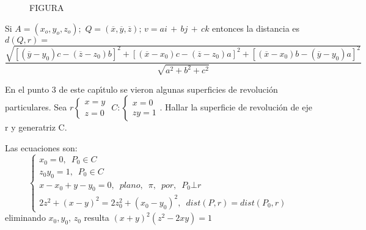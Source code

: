 \begin{figure}[htb]
\centering
FIGURA
\end{figure}
%
%
%
%


\bigskip

Si $A = ( x_{o} ,y_{o} ,z_{o});\,\,Q = (\overline {x} ,\overline
{y} ,\overline {z} );\,v = ai\, + \,bj\, + \,ck$ entonces la
distancia es $ d(Q,r)=$ $$
\frac{\sqrt{[(\overline{y}-y_{0})c-(\overline{z}-z_{0})b]^{2}+
[(\overline{x}-x_{0})c-(\overline{z}-z_{0})a]^{2}+[(\overline{x}-x_{0})b-(\overline{y}-y_{0})a]^{2}}}
{\sqrt{a^{2}+b^{2}+c^{2}}}$$

\bigskip

\begin{ejemplo}\label{piej5.1}En el punto 3 de este cap\'{\i}tulo se vieron
algunas superficies de revoluci\'{o}n particulares. Sea $r\left\{
\begin{array}{l}
 {x = y} \\
 {z = 0}
 \end{array} \right.$ $C:\left\{ \begin{array}{l}
 {x = 0} \\
 {zy = 1}
 \end{array} \right.$. Hallar la superficie de revoluci\'{o}n de eje r
y generatriz C.

Las ecuaciones son:
\[
\left\{ \begin{array}{l}
 {x_{0}^{}  = 0                                 ,\,\,\,            P_{0}^{}  \in C}
\\
 {z_{0}^{} y_{0}^{}  = 1                  ,\,\,\,                        P_{0}^{}
\in C} \\
 {x - x_{0}^{}  + y - y_{0}^{}  = 0              ,\,\,\,            plano ,\,\,\, \pi ,\,\,\, por
,\,\,\, P_{0}^{}  \bot r} \\
 {2z^{2} + \left( {x - y} \right)^{2} = 2z_{0}^{2}  + \left( {x_{0}^{}  -
y_{0}^{} } \right)^{2} ,\,\,\,  dist\left( {P,r} \right) =
dist\left( {P_{0}^{} ,r} \right)}
 \end{array} \right.
\]
eliminando $x_{0}^{} ,y_{0}^{} ,\,z_{0}^{} $ resulta $\left( {x +
y} \right)^{2}\left( {z^{2} - 2xy} \right) = 1$
\end{ejemplo}

